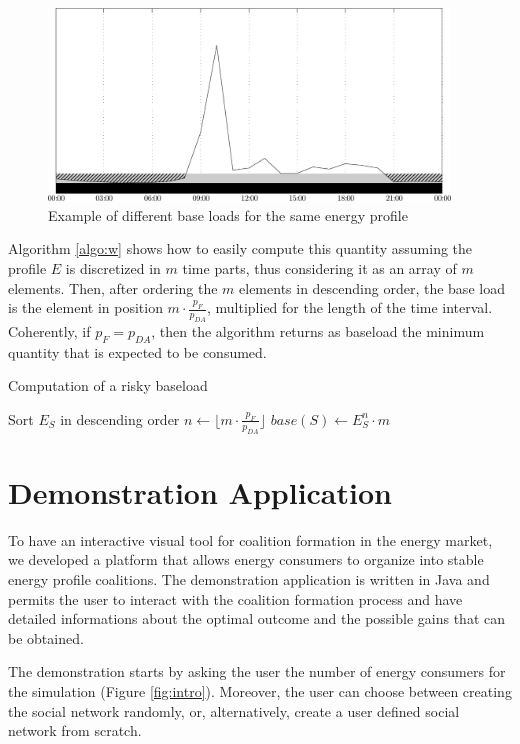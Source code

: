 \documentclass[11pt, twoside, titlepage, a4paper, openright]{report}
\begin{document}
\begin{figure}[!h]
	\centering
	\includegraphics[width=0.95\textwidth]{img/upf.pdf}
	\caption{\label{fig:upf}Example of different base loads for the same energy profile}
\end{figure}

\noindent Algorithm \ref{algo:w} shows how to easily compute this quantity assuming the profile $E$ is discretized in $m$ time parts, thus considering it as an array of $m$ elements. Then, after ordering the $m$ elements in descending order, the base load is the element in position $m \cdot \frac{p_F}{p_{DA}}$, multiplied for the length of the time interval. Coherently, if $p_F = p_{DA}$, then the algorithm returns as baseload the minimum quantity that is expected to be consumed.

\begin{algorithm}[!h]\caption{Computation of a risky baseload}\label{algo:w}
\begin{algorithmic}
\State Sort $E_S$ in descending order
\State $n \gets \lfloor m \cdot \frac{p_F}{p_{DA}}\rfloor$
\State $base(S) \gets E_S^n \cdot m$
\end{algorithmic}
\end{algorithm}

\section{Demonstration Application}\label{sec:demo}

To have an interactive visual tool for coalition formation in the energy market, we developed a platform that allows energy
consumers to organize into stable energy profile coalitions. The demonstration application is written in Java and permits the user to interact with the coalition formation process and have detailed informations about the optimal outcome and the possible gains that can be obtained.

The demonstration starts by asking the user the number of energy consumers for the simulation (Figure \ref{fig:intro}). Moreover, the user can choose between creating the social network randomly, or, alternatively, create a user defined social network from scratch.
\end{document}
